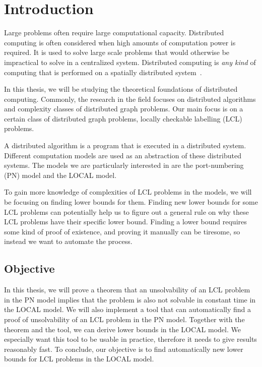 
\section{Introduction}  \label{sec:introduction}

Large problems often require large computational capacity.
Distributed computing is often considered when high amounts of computation power is required.
It is used to solve large scale problems that would otherwise be impractical to solve in a centralized system.
Distributed computing is \emph{any kind} of computing that is performed on a spatially distributed system~\cite{DBLP:books/el/leeuwen90/LamportL90}.

In this thesis, we will be studying the theoretical foundations of distributed computing.
Commonly, the research in the field focuses on distributed algorithms and complexity classes of distributed graph problems.
Our main focus is on a certain class of distributed graph problems, locally checkable labelling (LCL) problems.

A distributed algorithm is a program that is executed in a distributed system.
Different computation models are used as an abstraction of these distributed systems.
The models we are particularly interested in are the port-numbering (PN) model and the LOCAL model.


To gain more knowledge of complexities of LCL problems in the models, we will be focusing on finding lower bounds for them.
Finding new lower bounds for some LCL problems can potentially help us to figure out a general rule on why these LCL problems have their specific lower bound.
Finding a lower bound requires some kind of proof of existence, and proving it manually can be tiresome, so instead we want to automate the process.

\subsection{Objective}
In this thesis, we will prove a theorem that an unsolvability of an LCL problem in the PN model implies that the problem is also not solvable in constant time in the LOCAL model.
We will also implement a tool that can automatically find a proof of unsolvability of an LCL problem in the PN model.
Together with the theorem and the tool, we can derive lower bounds in the LOCAL model.
We especially want this tool to be usable in practice, therefore it needs to give results reasonably fast.
To conclude, our objective is to find automatically new lower bounds for LCL problems in the LOCAL model.

